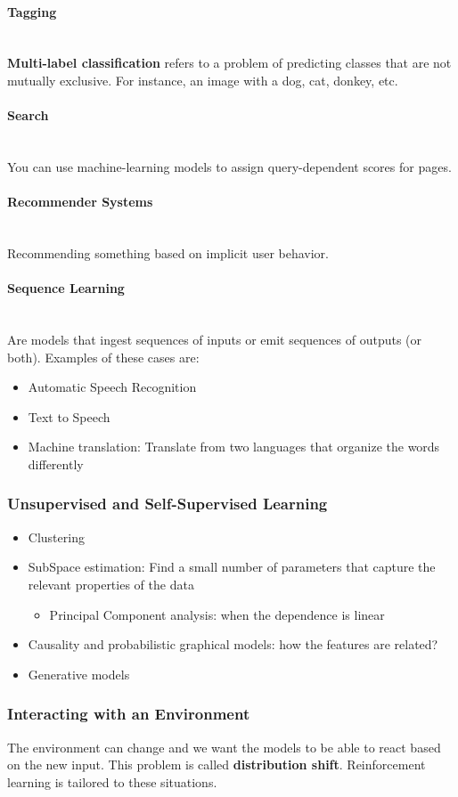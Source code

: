 \documentclass[]{article}
\newcommand{\eparagraph}[1]{\paragraph{#1}~\\}
\begin{document}
\eparagraph{Tagging}
\textbf{Multi-label classification} refers to a problem of predicting classes that
are not mutually exclusive. For instance, an image with a dog, cat, donkey, etc.

\eparagraph{ Search}
You can use machine-learning models to assign query-dependent scores for pages.

\eparagraph{Recommender Systems}
Recommending something based on implicit user behavior.

\eparagraph{Sequence Learning}
Are models that ingest sequences of inputs or emit sequences of outputs (or both).
Examples of these cases are:

\begin{itemize}
    \item Automatic Speech Recognition
    \item Text to Speech
    \item Machine translation: Translate from two languages that organize the words
          differently
\end{itemize}

\subsubsection{Unsupervised and Self-Supervised Learning}
\begin{itemize}
    \item Clustering
    \item SubSpace estimation: Find a small number of parameters that capture the
          relevant properties of the data
          \begin{itemize}
              \item Principal Component analysis: when the dependence is linear
          \end{itemize}
    \item Causality and probabilistic graphical models: how the features are related?
    \item Generative models
\end{itemize}

\subsubsection{Interacting with an Environment}
The environment can change and we want the models to be able to react based on
the new input. This problem is called \textbf{distribution shift}. Reinforcement
learning is tailored to these situations.
\end{document}
